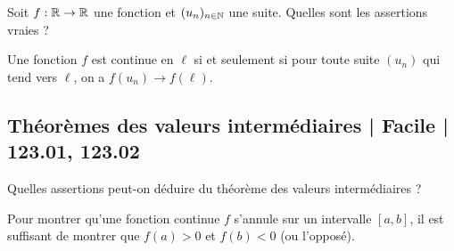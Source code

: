 \begin{question}
Soit $f : \mathbb{R} \to \mathbb{R}$ une fonction et $(u_n)_{n\in\mathbb{N}}$ une suite. Quelles sont les assertions vraies ?
\begin{answers}



  
\end{answers}
\begin{explanations}
Une fonction $f$ est continue en $\ell$ si et seulement si 
pour toute suite $(u_n)$ qui tend vers $\ell$, on a $f(u_n) \to f(\ell)$.
\end{explanations}
\end{question}


\subsection{Théorèmes des valeurs intermédiaires | Facile | 123.01, 123.02}


\begin{question}
Quelles assertions peut-on déduire du théorème des valeurs intermédiaires ?
\begin{answers}


    \good{$\ln(x+1)-x+1$ s'annule sur $[0,+\infty[$.}

\end{answers}
\begin{explanations}
Pour montrer qu'une fonction continue $f$ s'annule sur un intervalle $[a,b]$, il est suffisant de montrer que $f(a)>0$ et $f(b)<0$ (ou l'opposé).
\end{explanations}
\end{question}



